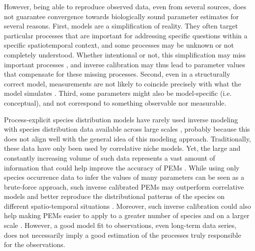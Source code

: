 \documentclass[preprint,12pt,authoryear]{elsarticle}
\begin{document}
However, being able to reproduce observed data, even from several sources, does not guarantee convergence towards biologically sound parameter estimates for several reasons. First, models are a simplification of reality. They often target particular processes that are important for addressing specific questions within a specific spatiotemporal context, and some processes may be unknown or not completely understood. Whether intentional or not, this simplification may miss important processes \citep{Forrester2021}, and inverse calibration may thus lead to parameter values that compensate for these missing processes. Second, even in a structurally correct model, measurements are not likely to coincide precisely with what the model simulates \citep{Zhang2024}. Third, some parameters might also be model-specific (i.e. conceptual), and not correspond to something observable nor measurable.

Process-explicit species distribution models have rarely used inverse modeling with species distribution data available across large scales \citep{Pagel2011, Higgins2012, VanderMeersch2023}, probably because this does not align well with the general idea of this modeling approach. Traditionally, these data have only been used by correlative niche models. Yet, the large and constantly increasing volume of such data \citep{Feng2022} represents a vast amount of information that could help improve the accuracy of PEMs \citep{Evans2016}. While using only species occurrence data to infer the values of many parameters can be seen as a brute-force approach, such inverse calibrated PEMs may outperform correlative models and better reproduce the distributional patterns of the species on different spatio-temporal situations \citep{Higgins2020, VanderMeersch2024}.  Moreover, such inverse calibration could also help making PEMs easier to apply to a greater number of species and on a larger scale \citep[e.g.][]{Conradi2024}. However, a good model fit to observations, even long-term data series, does not necessarily imply a good estimation of the processes truly responsible for the observations. 
\end{document}
